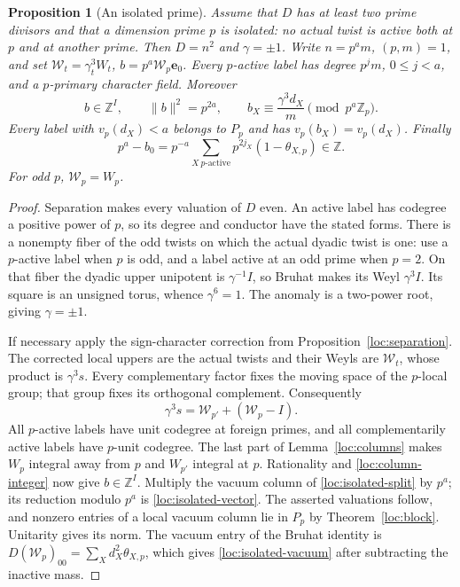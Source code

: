 \documentclass[11pt,a4paper]{article}
\numberwithin{equation}{section}
\newtheorem{proposition}[theorem]{Proposition}
\begin{document}
\begin{proposition}[An isolated prime]\label{loc:isolation}
Assume that $D$ has at least two prime divisors and that a dimension
prime $p$ is isolated: no actual twist is active both at $p$ and
at another prime. Then $D=n^2$ and $\gamma=\pm1$. Write
$n=p^a m$, $(p,m)=1$, and set
$\mathcal W_t=\gamma_t^3W_t$, $b=p^a\mathcal W_p\mathbf e_0$.
Every $p$-active label has degree $p^jm$, $0\le j<a$, and a
$p$-primary character field. Moreover
\begin{equation}\label{loc:isolated-vector}
 b\in\mathbb Z^I,\qquad \|b\|^2=p^{2a},\qquad
 b_X\equiv\frac{\gamma^3d_X}{m}\pmod{p^a\mathbb Z_p}.
\end{equation}
Every label with $v_p(d_X)<a$ belongs to $P_p$ and has
$v_p(b_X)=v_p(d_X)$. Finally
\begin{equation}\label{loc:isolated-vacuum}
 p^a-b_0
 =p^{-a}\sum_{X\ p\text{-active}}
                      p^{2j_X}(1-\theta_{X,p})\in\mathbb Z.
\end{equation}
For odd $p$, $\mathcal W_p=W_p$.
\end{proposition}
\begin{proof}
Separation makes every valuation of $D$ even. An active label has
codegree a positive power of $p$, so its degree and conductor have
the stated forms. There is a nonempty fiber of the odd twists on
which the actual dyadic twist is one: use a $p$-active label when
$p$ is odd, and a label active at an odd prime when $p=2$.
On that fiber the dyadic upper unipotent is $\gamma^{-1}I$, so
Bruhat makes its Weyl $\gamma^3I$. Its square is an unsigned torus,
whence $\gamma^6=1$. The anomaly is a two-power root, giving
$\gamma=\pm1$.

If necessary apply the sign-character correction from
Proposition~\ref{loc:separation}. The corrected local uppers are
the actual twists and their Weyls are $\mathcal W_t$, whose product
is $\gamma^3s$. Every complementary factor fixes the moving space
of the $p$-local group; that group fixes its orthogonal complement.
Consequently
\begin{equation}\label{loc:isolated-split}
       \gamma^3s=\mathcal W_{p'}+(\mathcal W_p-I).
\end{equation}
All $p$-active labels have unit codegree at foreign primes, and all
complementarily active labels have $p$-unit codegree. The last part
of Lemma~\ref{loc:columns} makes $W_p$ integral away from $p$ and
$W_{p'}$ integral at $p$. Rationality and
\eqref{loc:column-integer} now give $b\in\mathbb Z^I$.
Multiply the vacuum column of \eqref{loc:isolated-split} by $p^a$;
its reduction modulo $p^a$ is \eqref{loc:isolated-vector}.
The asserted valuations follow, and nonzero entries of a local
vacuum column lie in $P_p$ by Theorem~\ref{loc:block}.
Unitarity gives its norm. The vacuum entry of the Bruhat identity is
$D(\mathcal W_p)_{00}=\sum_Xd_X^2\theta_{X,p}$, which gives
\eqref{loc:isolated-vacuum} after subtracting the inactive mass.
\end{proof}
\end{document}

